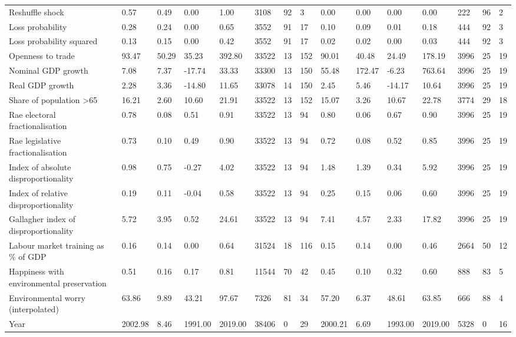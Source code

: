 \begin{longtable}{lllllllllllllll}
Reshuffle shock & 0.57 & 0.49 & 0.00 & 1.00 & 3108 & 92 & 3 & 0.00 & 0.00 & 0.00 & 0.00 & 222 & 96 & 2\\
Loss probability & 0.28 & 0.24 & 0.00 & 0.65 & 3552 & 91 & 17 & 0.10 & 0.09 & 0.01 & 0.18 & 444 & 92 & 3\\
\addlinespace
Loss probability squared & 0.13 & 0.15 & 0.00 & 0.42 & 3552 & 91 & 17 & 0.02 & 0.02 & 0.00 & 0.03 & 444 & 92 & 3\\
Openness to trade & 93.47 & 50.29 & 35.23 & 392.80 & 33522 & 13 & 152 & 90.01 & 40.48 & 24.49 & 178.19 & 3996 & 25 & 19\\
Nominal GDP growth & 7.08 & 7.37 & -17.74 & 33.33 & 33300 & 13 & 150 & 55.48 & 172.47 & -6.23 & 763.64 & 3996 & 25 & 19\\
Real GDP growth & 2.28 & 3.36 & -14.80 & 11.65 & 33078 & 14 & 150 & 2.45 & 5.46 & -14.17 & 10.64 & 3996 & 25 & 19\\
Share of population >65 & 16.21 & 2.60 & 10.60 & 21.91 & 33522 & 13 & 152 & 15.07 & 3.26 & 10.67 & 22.78 & 3774 & 29 & 18\\
\addlinespace
Rae electoral fractionalisation & 0.78 & 0.08 & 0.51 & 0.91 & 33522 & 13 & 94 & 0.80 & 0.06 & 0.67 & 0.90 & 3996 & 25 & 19\\
Rae legislative fractionalisation & 0.73 & 0.10 & 0.49 & 0.90 & 33522 & 13 & 94 & 0.72 & 0.08 & 0.52 & 0.85 & 3996 & 25 & 19\\
Index of absolute disproportionality & 0.98 & 0.75 & -0.27 & 4.02 & 33522 & 13 & 94 & 1.48 & 1.39 & 0.34 & 5.92 & 3996 & 25 & 19\\
Index of relative disproportionality & 0.19 & 0.11 & -0.04 & 0.58 & 33522 & 13 & 94 & 0.25 & 0.15 & 0.06 & 0.60 & 3996 & 25 & 19\\
Gallagher index of disproportionality & 5.72 & 3.95 & 0.52 & 24.61 & 33522 & 13 & 94 & 7.41 & 4.57 & 2.33 & 17.82 & 3996 & 25 & 19\\
\addlinespace
Labour market training as \% of GDP & 0.16 & 0.14 & 0.00 & 0.64 & 31524 & 18 & 116 & 0.15 & 0.14 & 0.00 & 0.46 & 2664 & 50 & 12\\
Happiness with environmental preservation & 0.51 & 0.16 & 0.17 & 0.81 & 11544 & 70 & 42 & 0.45 & 0.10 & 0.32 & 0.60 & 888 & 83 & 5\\
Environmental worry (interpolated) & 63.86 & 9.89 & 43.21 & 97.67 & 7326 & 81 & 34 & 57.20 & 6.37 & 48.61 & 63.85 & 666 & 88 & 4\\
Year & 2002.98 & 8.46 & 1991.00 & 2019.00 & 38406 & 0 & 29 & 2000.21 & 6.69 & 1993.00 & 2019.00 & 5328 & 0 & 16\\
\bottomrule
\end{longtable}
